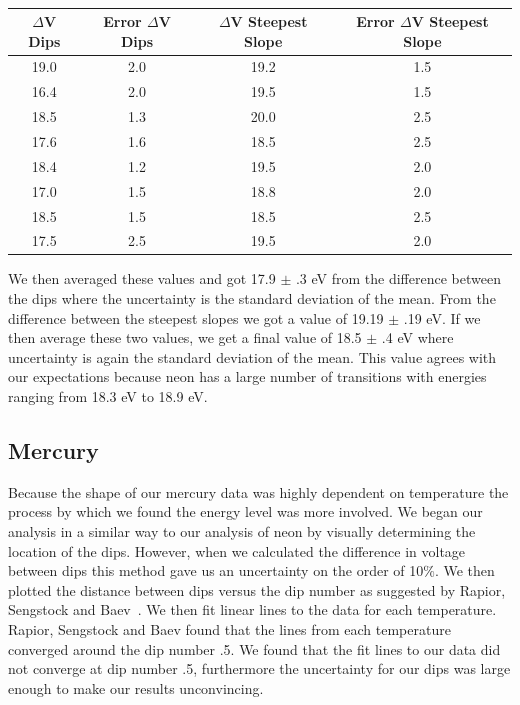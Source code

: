 \documentclass[prb,preprint]{revtex4-1}
\begin{document}
\begin{table}[h!]
\centering
\caption{ }
\begin{ruledtabular}
\begin{tabular}{c c c c}
$\Delta$V Dips & Error $\Delta$V Dips & $\Delta$V Steepest Slope &  Error $\Delta$V Steepest Slope\\
\hline	%
19.0 & 2.0 & 19.2 & 1.5  \\
16.4 & 2.0 & 19.5 & 1.5  \\
18.5 & 1.3 & 20.0 & 2.5  \\
17.6 & 1.6 & 18.5 & 2.5  \\
18.4 & 1.2 & 19.5 & 2.0  \\
17.0 & 1.5 & 18.8 & 2.0  \\
18.5 & 1.5 & 18.5 & 2.5  \\
17.5 & 2.5 & 19.5 & 2.0  \\

\end{tabular}
\end{ruledtabular}
\label{neon_dvs}
\end{table}

We then averaged these values and got 17.9 $\pm$ .3 eV from the difference between the dips where the uncertainty is the standard deviation of the mean. From the difference between the steepest slopes we got a value of 19.19 $\pm$ .19 eV. If we then average these two values, we get a final value of 18.5 $\pm$ .4 eV where uncertainty is again the standard deviation of the mean. This value agrees with our expectations because neon has a large number of transitions with energies ranging from 18.3 eV to 18.9 eV.

\subsection{Mercury}

Because the shape of our mercury data was highly dependent on temperature the process by which we found the energy level was more involved. We began our analysis in a similar way to our analysis of neon by visually determining the location of the dips. However, when we calculated the difference in voltage between dips this method gave us an uncertainty on the order of 10$\%$. We then plotted the distance between dips versus the dip number as suggested by Rapior, Sengstock and Baev~\cite{newfeatures}. We then fit linear lines to the data for each temperature. Rapior, Sengstock and Baev found that the lines from each temperature converged around the dip number .5. We found that the fit lines to our data did not converge at dip number .5, furthermore the uncertainty for our dips was large enough to make our results unconvincing.
\end{document}

